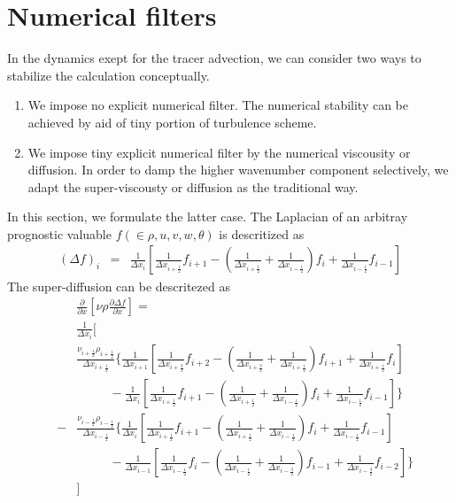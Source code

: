 \section{Numerical filters}

In the dynamics exept for the tracer advection,
we can consider two ways to stabilize the calculation conceptually.
\begin{enumerate}
\item We impose no explicit numerical filter.
The numerical stability can be achieved
by aid of tiny portion of turbulence scheme.
\item We impose tiny explicit numerical filter by the numerical viscousity or diffusion.
In order to damp the higher wavenumber component selectively,
we adapt the super-viscousty or diffusion as the traditional way.
\end{enumerate}
In this section, we formulate the latter case.
The Laplacian of an arbitray prognostic valuable $f (\in \rho, u, v, w, \theta)$ 
is descritized as
{\footnotesize
\begin{eqnarray}
(\Delta f)_i &=& 
\frac{1}{\Delta x_i}\left[
\frac{1}{\Delta x_{i+\frac{1}{2}}}f_{i+1}
-\left(\frac{1}{\Delta x_{i+\frac{1}{2}}}+\frac{1}{\Delta x_{i-\frac{1}{2}}}\right)f_i
+\frac{1}{\Delta x_{i-\frac{1}{2}}}f_{i-1}\right]
%
\end{eqnarray}
}
The super-diffusion can be descritezed as
{\footnotesize
\begin{eqnarray}
&&\frac{\partial }{\partial x}\left[\nu \rho \frac{\partial \Delta f}{\partial x}\right]  =\nonumber\\
&&
\frac{1}{\Delta x_{i}}
\Bigg[\nonumber\\
&&\frac{\nu_{i+\frac{1}{2}}\rho_{i+\frac{1}{2}}}{\Delta x_{i+\frac{1}{2}}}
\Bigg\{\frac{1}{\Delta x_{i+1}}\left[
\frac{1}{\Delta x_{i+\frac{3}{2}}}f_{i+2}
-\left(\frac{1}{\Delta x_{i+\frac{3}{2}}}+\frac{1}{\Delta x_{i+\frac{1}{2}}}\right)f_{i+1}
+\frac{1}{\Delta x_{i+\frac{1}{2}}}f_{i}\right]\nonumber\\
&&~~~~~~~~~~~~ -\frac{1}{\Delta x_i}\left[
\frac{1}{\Delta x_{i+\frac{1}{2}}}f_{i+1}
-\left(\frac{1}{\Delta x_{i+\frac{1}{2}}}+\frac{1}{\Delta x_{i-\frac{1}{2}}}\right)f_i
+\frac{1}{\Delta x_{i-\frac{1}{2}}}f_{i-1}\right]\Bigg\}
\nonumber\\
%
&-&
\frac{\nu_{i-\frac{1}{2}}\rho_{i-\frac{1}{2}}}{\Delta x_{i-\frac{1}{2}}}
\Bigg\{\frac{1}{\Delta x_{i}}\left[
\frac{1}{\Delta x_{i+\frac{1}{2}}}f_{i+1}
-\left(\frac{1}{\Delta x_{i+\frac{1}{2}}}+\frac{1}{\Delta x_{i-\frac{1}{2}}}\right)f_{i}
+\frac{1}{\Delta x_{i-\frac{1}{2}}}f_{i-1}\right]\nonumber\\
&&~~~~~~~~~~~~ -\frac{1}{\Delta x_{i-1}}\left[
\frac{1}{\Delta x_{i-\frac{1}{2}}}f_{i}
-\left(\frac{1}{\Delta x_{i-\frac{1}{2}}}+\frac{1}{\Delta x_{i-\frac{3}{2}}}\right)f_{i-1}
+\frac{1}{\Delta x_{i-\frac{3}{2}}}f_{i-2}\right]\Bigg\}\nonumber\\
&&\Bigg]
%
%
\end{eqnarray}
}
